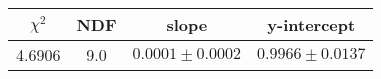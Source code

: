 \begin{tabular}{|c|c|c|c|}

\hline
$\chi^{2}$ & NDF & slope & y-intercept  \\
\hline
4.6906 & 9.0 & $0.0001\pm0.0002$ & $0.9966\pm0.0137$ \\
\hline

\end{tabular}